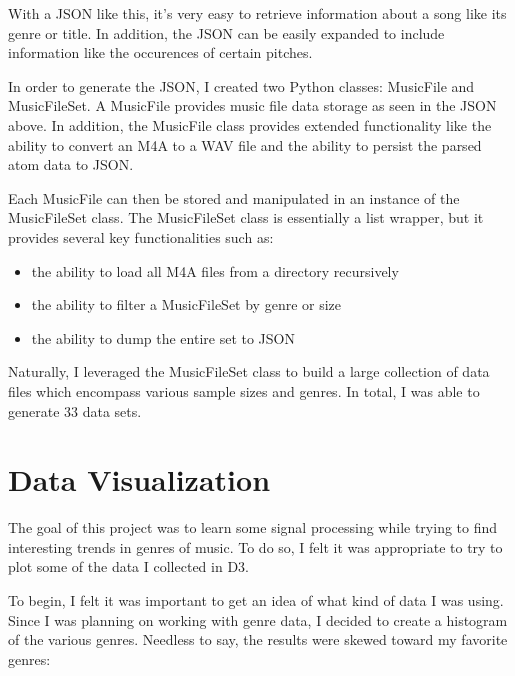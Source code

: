 \documentclass[journal]{vgtc}                %
\begin{document}
With a JSON like this, it's very easy to retrieve information about a song like
its genre or title. In addition, the JSON can be easily expanded to include
information like the occurences of certain pitches.

In order to generate the JSON, I created two Python classes: MusicFile and
MusicFileSet. A MusicFile provides music file data storage as seen in the JSON
above. In addition, the MusicFile class provides extended functionality like
the ability to convert an M4A to a WAV file and the ability to persist the
parsed atom data to JSON.

Each MusicFile can then be stored and manipulated in an instance of the
MusicFileSet class. The MusicFileSet class is essentially a list wrapper, but
it provides several key functionalities such as:

\begin{itemize}
  \item the ability to load all M4A files from a directory recursively
  \item the ability to filter a MusicFileSet by genre or size
  \item the ability to dump the entire set to JSON
\end{itemize}

Naturally, I leveraged the MusicFileSet class to build a large collection of
data files which encompass various sample sizes and genres. In total, I was
able to generate 33 data sets.

\section{Data Visualization}

The goal of this project was to learn some signal processing while trying to
find interesting trends in genres of music. To do so, I felt it was appropriate
to try to plot some of the data I collected in D3.

To begin, I felt it was important to get an idea of what kind of data I was
using. Since I was planning on working with genre data, I decided to create
a histogram of the various genres. Needless to say, the results were skewed
toward my favorite genres:
\end{document}
